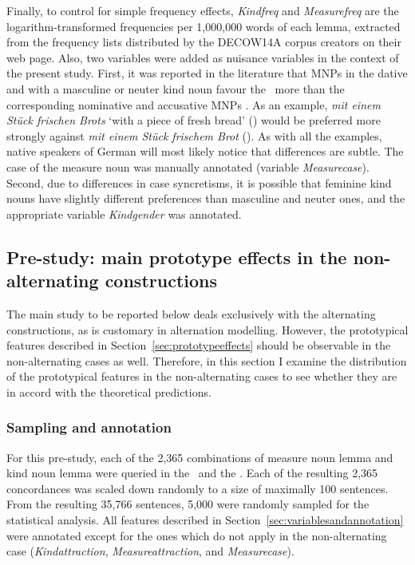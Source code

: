 Finally, to control for simple frequency effects, \textit{Kindfreq} and \textit{Measurefreq} are the logarithm-transformed frequencies per 1,000,000 words of each lemma, extracted from the frequency lists distributed by the DECOW14A corpus creators on their web page.
Also, two variables were added as nuisance variables in the context of the present study.
First, it was reported in the literature that MNPs in the dative and with a masculine or neuter kind noun favour the \PGCa\ more than the corresponding nominative and accusative MNPs \citep{Hentschel1993,Zimmer2015}.
As an example, \textit{mit einem Stück frischen Brots} `with a piece of fresh bread' (\PGCa) would be preferred more strongly against \textit{mit einem Stück frischem Brot} (\NACa).
As with all the examples, native speakers of German will most likely notice that differences are subtle.
The case of the measure noun was manually annotated (variable \textit{Measurecase}).
Second, due to differences in case syncretisms, it is possible that feminine kind nouns have slightly different preferences than masculine and neuter ones, and the appropriate variable \textit{Kindgender} was annotated.

\subsection{Pre-study: main prototype effects in the non-alternating constructions}
\label{sec:prestudy}

The main study to be reported below deals exclusively with the alternating constructions, as is customary in alternation modelling.
However, the prototypical features described in Section~\ref{sec:prototypeeffects} should be observable in the non-alternating cases as well.
Therefore, in this section I examine the distribution of the prototypical features in the non-alternating cases to see whether they are in accord with the theoretical predictions.

\subsubsection{Sampling and annotation}

For this pre-study, each of the 2,365 combinations of measure noun lemma and kind noun lemma were queried in the \NACb\ and the \PGCd.
Each of the resulting 2,365 concordances was scaled down randomly to a size of maximally 100 sentences.
From the resulting 35,766 sentences, 5,000 were randomly sampled for the statistical analysis.
All features described in Section~\ref{sec:variablesandannotation} were annotated except for the ones which do not apply in the non-alternating case (\textit{Kindattraction}, \textit{Measureattraction}, and \textit{Measurecase}).

